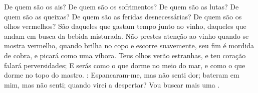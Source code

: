{  De quem são os ais? De quem são os sofrimentos? De quem são as lutas? De quem são as queixas? De quem são as feridas desnecessárias? De quem são os olhos vermelhos?
  São daqueles que gastam tempo junto ao vinho, daqueles que andam em busca da bebida misturada.
  Não prestes atenção ao vinho quando se mostra vermelho, quando brilha no copo e escorre suavemente,
   seu fim é
{} mordida de cobra, e picará como uma víbora.
  Teus olhos verão
{} estranhas, e teu coração falará perversidades;
  E serás como o que dorme no meio do mar, e como o que dorme no topo do mastro.
   : Espancaram-me, mas não senti dor; bateram em mim, mas não senti; quando virei a despertar? Vou buscar mais uma
{} .
\par }


